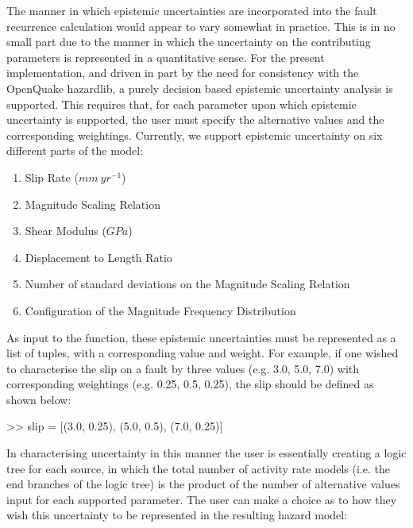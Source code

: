 The manner in which epistemic uncertainties are incorporated into the fault recurrence calculation would appear to vary somewhat in practice. This is in no small part due to the manner in which the uncertainty on the contributing parameters is represented in a quantitative sense. For the present implementation, and driven in part by the need for consistency with the OpenQuake hazardlib, a purely decision based epistemic uncertainty analysis is supported. This requires that, for each parameter upon which epistemic uncertainty is supported, the user must specify the alternative values and the corresponding weightings. Currently, we support epistemic uncertainty on six different parts of the model:

\begin{enumerate}
\item Slip Rate ($mm\ yr^{-1}$)

\item Magnitude Scaling Relation

\item Shear Modulus ($GPa$)

\item Displacement to Length Ratio

\item Number of standard deviations on the Magnitude Scaling Relation

\item Configuration of the Magnitude Frequency Distribution
\end{enumerate}

As input to the function, these epistemic uncertainties must be represented as a list of tuples, with a corresponding value and weight. For example, if one wished to characterise the slip on a fault by three values (e.g. 3.0, 5.0, 7.0) with corresponding weightings (e.g. 0.25, 0.5, 0.25), the slip should be defined as shown below: 

\begin{python}[frame=single]
>> slip = [(3.0, 0.25), (5.0, 0.5), (7.0, 0.25)]
\end{python}

In characterising uncertainty in this manner the user is essentially creating a logic tree for each source, in which the total number of activity rate models (i.e. the end branches of the logic tree) is the product of the number of alternative values input for each supported parameter. The user can make a choice as to how they wish this uncertainty to be represented in the resulting hazard model:

